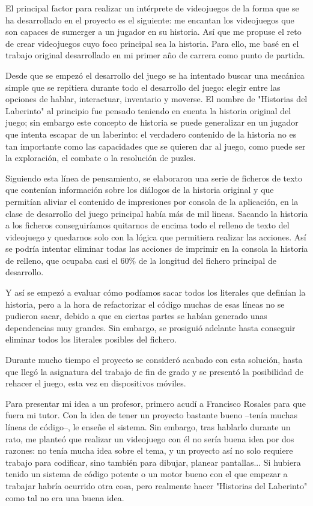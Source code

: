 El principal factor para realizar un intérprete de videojuegos de la forma que se ha desarrollado en el proyecto es el siguiente: me encantan los videojuegos que son capaces de sumerger a un jugador en su historia. Así que me propuse el reto de crear videojuegos cuyo foco principal sea la historia. Para ello, me basé en el trabajo original desarrollado en mi primer año de carrera como punto de partida.

Desde que se empezó el desarrollo del juego se ha intentado buscar una mecánica simple que se repitiera durante todo el desarrollo del juego: elegir entre las opciones de hablar, interactuar, inventario y moverse. 
El nombre de "Historias del Laberinto" al principio fue pensado teniendo en cuenta la historia original del juego; sin embargo este concepto de historia se puede generalizar en un jugador que intenta escapar de un laberinto: el verdadero contenido de la historia no es tan importante como las capacidades que se quieren dar al juego, como puede ser la exploración, el combate o la resolución de puzles.

Siguiendo esta línea de pensamiento, se elaboraron una serie de ficheros de texto que contenían información sobre los diálogos de la historia original y que permitían aliviar el contenido de impresiones por consola de la aplicación, en la clase de desarrollo del juego principal había más de mil lineas.
Sacando la historia a los ficheros conseguiríamos quitarnos de encima todo el relleno de texto del videojuego y quedarnos solo con la lógica que permitiera realizar las acciones. Así se podría intentar eliminar todas las acciones de imprimir en la consola la historia de relleno, que ocupaba casi el 60\% de la longitud del fichero principal de desarrollo.

Y así se empezó a evaluar cómo podíamos sacar todos los literales que definían la historia, pero a la hora de refactorizar el código muchas de esas líneas no se pudieron sacar, debido a que en ciertas partes se habían generado unas dependencias muy grandes. Sin embargo, se prosiguió adelante hasta conseguir eliminar todos los literales posibles del fichero.

Durante mucho tiempo el proyecto se consideró acabado con esta solución, hasta que llegó la asignatura del trabajo de fin de grado y se presentó la posibilidad de rehacer el juego, esta vez en dispositivos móviles.

Para presentar mi idea a un profesor, primero acudí a Francisco Rosales para que fuera mi tutor. Con la idea de tener un proyecto bastante bueno –tenía muchas líneas de código–, le enseñe el sistema. Sin embargo, tras hablarlo durante un rato, me planteó que realizar un videojuego con él no sería buena idea por dos razones: no tenía mucha idea sobre el tema, y un proyecto así no solo requiere trabajo para codificar, sino también para dibujar, planear pantallas... Si hubiera tenido un sistema de código potente o un motor bueno con el que empezar a trabajar habría ocurrido otra cosa, pero realmente hacer "Historias del Laberinto" como tal no era una buena idea.

